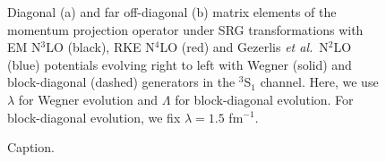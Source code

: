 \documentclass[preprintnumbers,floatfix,aps,prc,preprint,nofootinbib]{revtex4-1}
\begin{document}
%
\begin{figure}[H]
	\centering
	
	\caption{Diagonal (a) and far off-diagonal (b) matrix elements of the momentum projection operator under SRG transformations with EM N$^3$LO (black), RKE N$^4$LO (red) and Gezerlis \textit{et al.}~N$^2$LO (blue) potentials evolving right to left with Wegner (solid) and block-diagonal (dashed) generators in the $^3$S$_1$ channel. Here, we use $\lambda$ for Wegner evolution and $\Lambda$ for block-diagonal evolution. For block-diagonal evolution, we fix $\lambda=1.5$ fm$^{-1}$.}
	\label{fig:momentum_proj_3S1}
\end{figure}
%
\begin{figure}[H]
	\centering
	
	\caption{Caption.}
	\label{fig:momentum_projection_integrand_contours_q3,00_RKE}
\end{figure}
\end{document}
